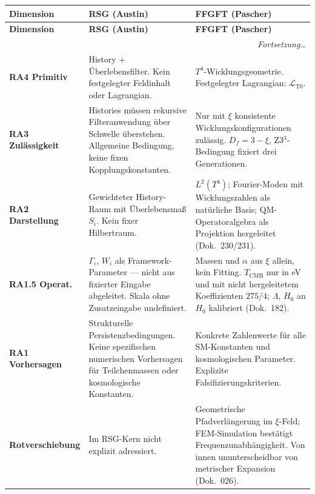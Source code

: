 \renewcommand{\arraystretch}{1.5}
{\small
\begin{longtable}{p{3.5cm}p{5.0cm}p{5.0cm}}
\toprule
\textbf{Dimension} & \textbf{RSG (Austin)} & \textbf{FFGFT (Pascher)} \\
\midrule
\endfirsthead
\toprule
\textbf{Dimension} & \textbf{RSG (Austin)} & \textbf{FFGFT (Pascher)} \\
\midrule
\endhead
\midrule\multicolumn{3}{r}{\footnotesize\itshape Fortsetzung\ldots}\\\endfoot
\bottomrule\endlastfoot

\textbf{RA4 Primitiv} &
History + Überlebensfilter. Kein festgelegter Feldinhalt oder Lagrangian. &
$T^4$-Wicklungsgeometrie. Festgelegter Lagrangian: $\mathcal{L}_{\text{T0}}$. \\

\midrule

\textbf{RA3 Zulässigkeit} &
Histories müssen rekursive Filteranwendung über Schwelle überstehen.
Allgemeine Bedingung, keine fixen Kopplungskonstanten. &
Nur mit $\xi$ konsistente Wicklungskonfigurationen zulässig.
$D_f = 3-\xi$, Z3$^3$-Bedingung fixiert drei Generationen. \\

\midrule

\textbf{RA2 Darstellung} &
Gewichteter History-Raum mit Überlebensmaß $S_i$. Kein fixer Hilbertraum. &
$L^2(T^4)$; Fourier-Moden mit Wicklungszahlen als natürliche Basis;
QM-Operatoralgebra als Projektion hergeleitet (Dok.~230/231). \\

\midrule

\textbf{RA1.5 Operat.} &
$\Gamma_i$, $W_i$ als Framework-Parameter — nicht aus fixierter Eingabe
abgeleitet. Skala ohne Zusatzeingabe undefiniert. &
Massen und $\alpha$ aus $\xi$ allein, kein Fitting. $T_\text{CMB}$ nur in eV und
mit nicht hergeleitetem Koeffizienten $275/4$; $\Lambda$, $H_0$ an $H_0$
kalibriert (Dok.~182). \\

\midrule

\textbf{RA1 Vorhersagen} &
Strukturelle Persistenzbedingungen. Keine spezifischen numerischen
Vorhersagen für Teilchenmassen oder kosmologische Konstanten. &
Konkrete Zahlenwerte für alle SM-Konstanten und kosmologischen
Parameter. Explizite Falsifizierungskriterien. \\

\midrule

\textbf{Rotverschiebung} &
Im RSG-Kern nicht explizit adressiert. &
Geometrische Pfadverlängerung im $\xi$-Feld; FEM-Simulation bestätigt
Frequenzunabhängigkeit. Von innen ununterscheidbar von metrischer
Expansion (Dok.~026). \\


\end{longtable}}
